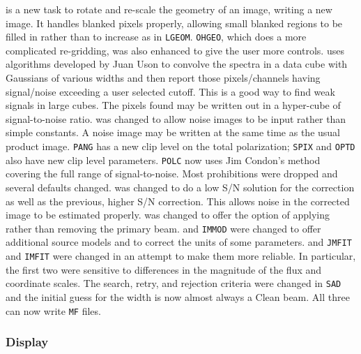 \begin{description}
 is a new task to rotate and re-scale the geometry of an
   image, writing a new image.  It handles blanked pixels properly,
   allowing small blanked regions to be filled in rather than to
   increase as in \hbox{{\tt LGEOM}}.  {\tt OHGEO}, which does a more
   complicated re-gridding, was also enhanced to give the user more
   controls.
 uses algorithms developed by Juan Uson to convolve the
   spectra in a data cube with Gaussians of various widths and then
   report those pixels/channels having signal/noise exceeding a user
   selected cutoff.  This is a good way to find weak signals in large
   cubes.  The pixels found may be written out in a hyper-cube of
   signal-to-noise ratio.
 was changed to allow noise images to be input rather
   than simple constants.  A noise image may be written at the same
   time as the usual product image.  {\tt PANG} has a new clip level
   on the total polarization; {\tt SPIX} and {\tt OPTD} also have new
   clip level parameters.  {\tt POLC} now uses Jim Condon's method
   covering the full range of signal-to-noise.  Most prohibitions were
   dropped and several defaults changed.
 was changed to do a low S/N solution for the correction
   as well as the previous, higher S/N correction.  This allows noise
   in the corrected image to be estimated properly.
 was changed to offer the option of applying rather than
   removing the primary beam.
 and {\tt IMMOD} were changed to offer additional source
   models and to correct the units of some parameters.
 and {\tt JMFIT} and {\tt IMFIT} were changed in an
   attempt to make them more reliable.  In particular, the first two
   were sensitive to differences in the magnitude of the flux and
   coordinate scales.  The search, retry, and rejection criteria were
   changed in {\tt SAD} and the initial guess for the width is now
   almost always a Clean beam.  All three can now write {\tt MF}
   files.
\end{description}

\subsubsection{Display}

